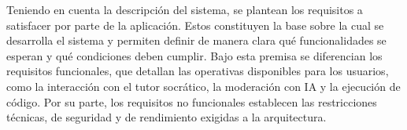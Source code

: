 Teniendo en cuenta la descripción del sistema, se plantean los requisitos a satisfacer por parte de la aplicación. Estos constituyen la base sobre la cual se desarrolla el sistema y permiten definir de manera clara qué funcionalidades se esperan y qué condiciones deben cumplir. Bajo esta premisa se diferencian los requisitos funcionales, que detallan las operativas disponibles para los usuarios, como la interacción con el tutor socrático, la moderación con IA y la ejecución de código. Por su parte, los requisitos no funcionales establecen las restricciones técnicas, de seguridad y de rendimiento exigidas a la arquitectura.
